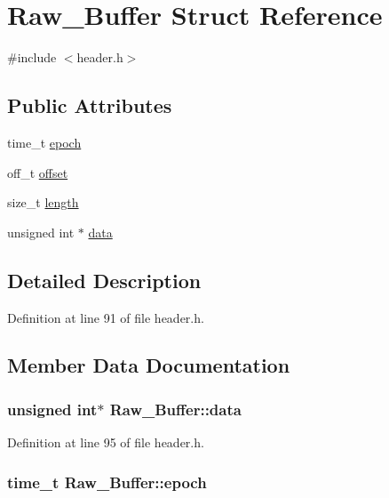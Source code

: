 \hypertarget{structRaw__Buffer}{
\section{Raw\_\-Buffer Struct Reference}
\label{structRaw__Buffer}
}


{\ttfamily \#include $<$header.h$>$}\subsection*{Public Attributes}
\begin{DoxyCompactItemize}
\item 
time\_\-t \hyperlink{structRaw__Buffer_aa8b9005768146c9972ea42efde25ba3e}{epoch}
\item 
off\_\-t \hyperlink{structRaw__Buffer_a75637fbc0758bd004fb0bc946b100488}{offset}
\item 
size\_\-t \hyperlink{structRaw__Buffer_ae80c202031025e289957de56066bf5c7}{length}
\item 
unsigned int $\ast$ \hyperlink{structRaw__Buffer_afdc16382505d8aaff1d51525823b31bc}{data}
\end{DoxyCompactItemize}


\subsection{Detailed Description}


Definition at line 91 of file header.h.

\subsection{Member Data Documentation}
\hypertarget{structRaw__Buffer_afdc16382505d8aaff1d51525823b31bc}{
\subsubsection[{data}]{\setlength{\rightskip}{0pt plus 5cm}unsigned int$\ast$ {\bf Raw\_\-Buffer::data}}}
\label{structRaw__Buffer_afdc16382505d8aaff1d51525823b31bc}


Definition at line 95 of file header.h.\hypertarget{structRaw__Buffer_aa8b9005768146c9972ea42efde25ba3e}{
\subsubsection[{epoch}]{\setlength{\rightskip}{0pt plus 5cm}time\_\-t {\bf Raw\_\-Buffer::epoch}}}
\label{structRaw__Buffer_aa8b9005768146c9972ea42efde25ba3e}


